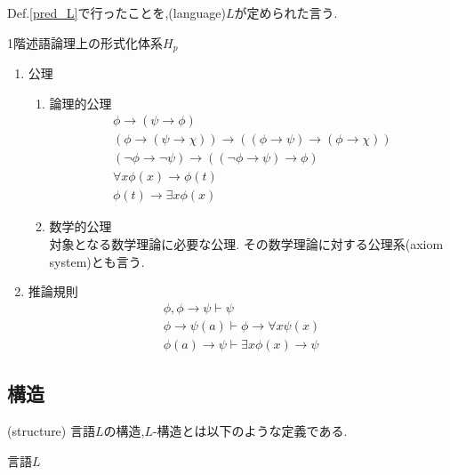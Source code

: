 Def.\ref{pred_L}で行ったことを,(language)$L$が定められた言う.

\begin{dfn}
 1階述語論理上の形式化体系$H_p$
  \begin{enumerate}
   \renewcommand{\labelenumii}{\arabic{enumii})}
   \item 公理
		 \begin{enumerate}
		  \item 論理的公理
				\begin{align}
				 \phi \to (\psi \to \phi) \tag{HA1} \\
				 (\phi \to (\psi \to \chi)) \to ((\phi \to \psi) \to (\phi \to \chi)) \tag{HA2} \\
				 (\lnot \phi \to \lnot \psi) \to ((\lnot \phi \to \psi) \to \phi) \tag{HA3} \\
				 \forall x \phi(x) \to \phi(t) \tag{HA4} \\
				 \phi(t) \to \exists x \phi(x) \tag{HA5}
				\end{align}
		  \item 数学的公理 \\
				対象となる数学理論に必要な公理. その数学理論に対する公理系(axiom system)とも言う.
		 \end{enumerate}
   \item 推論規則
		\begin{align}
		 \phi,\phi \to \psi \vdash \psi \tag{HR1} \\
		 \phi \to \psi(a) \vdash \phi \to \forall x \psi(x) \tag{HR2} \\
		 \phi(a) \to \psi \vdash \exists x \phi(x) \to \psi \tag{HR3}
		\end{align}
 \end{enumerate}
\end{dfn}

\subsection{構造}

\begin{dfn}
(structure)
 言語$L$の構造,$L$-構造とは以下のような定義である.
\end{dfn}
言語$L$